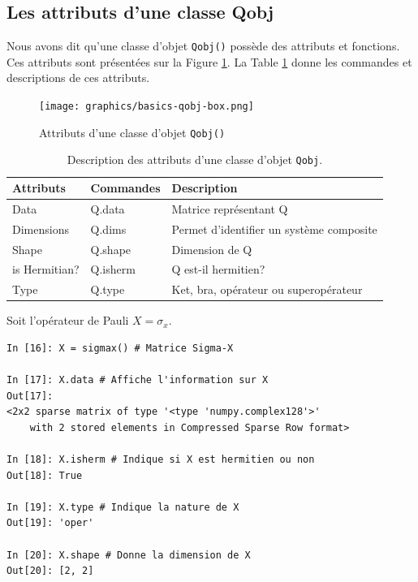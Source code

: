 \subsection{Les attributs d'une classe Qobj}

Nous avons dit qu'une classe d'objet \texttt{Qobj()} possède des attributs et 
fonctions. Ces attributs sont présentées sur la Figure \ref{fig:qobj}. La 
Table \ref{tab:class} donne les commandes et descriptions de ces attributs.

\begin{figure}[htbp]
\centering
 \texttt{[image: graphics/basics-qobj-box.png]}
\caption{Attributs d'une classe d'objet \texttt{Qobj()}}
\label{fig:qobj}
\end{figure}

\begin{table}[htpb]
\centering
\begin{tabular}{|l|l|l|} \hline \hline
\textbf{Attributs} &\textbf{Commandes}	&\textbf{Description}\\ \hline \hline
Data	&Q.data	&Matrice représentant Q\\ \hline
Dimensions	&Q.dims	&Permet d'identifier un système composite\\ \hline
Shape	&Q.shape	&Dimension de Q\\ \hline
is Hermitian?	&Q.isherm	&Q est-il hermitien?\\ \hline
Type	&Q.type	&Ket, bra, opérateur ou superopérateur\\ \hline
\end{tabular}
\caption{Description des attributs d'une classe d'objet \texttt{Qobj}.}
\label{tab:class}
\end{table}

\begin{example}
Soit l'opérateur de Pauli $X=\sigma_x$.
\end{example}
\begin{lstlisting}[commentstyle=\scriptsize]
In [16]: X = sigmax() # Matrice Sigma-X

In [17]: X.data # Affiche l'information sur X
Out[17]: 
<2x2 sparse matrix of type '<type 'numpy.complex128'>'
	with 2 stored elements in Compressed Sparse Row format>

In [18]: X.isherm # Indique si X est hermitien ou non
Out[18]: True

In [19]: X.type # Indique la nature de X
Out[19]: 'oper'

In [20]: X.shape # Donne la dimension de X
Out[20]: [2, 2]
\end{lstlisting}

